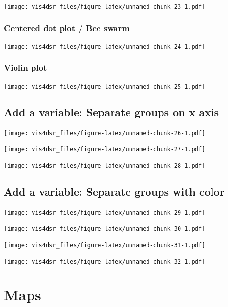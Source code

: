 \documentclass[
]{krantz}
\begin{document}
\texttt{[image: vis4dsr\_files/figure-latex/unnamed-chunk-23-1.pdf]}

\hypertarget{centered-dot-plot-bee-swarm}{%
\subsubsection{Centered dot plot / Bee swarm}\label{centered-dot-plot-bee-swarm}}

\texttt{[image: vis4dsr\_files/figure-latex/unnamed-chunk-24-1.pdf]}

\hypertarget{violin-plot}{%
\subsubsection{Violin plot}\label{violin-plot}}

\texttt{[image: vis4dsr\_files/figure-latex/unnamed-chunk-25-1.pdf]}

\hypertarget{add-a-variable-separate-groups-on-x-axis}{%
\subsection{Add a variable: Separate groups on x axis}\label{add-a-variable-separate-groups-on-x-axis}}

\texttt{[image: vis4dsr\_files/figure-latex/unnamed-chunk-26-1.pdf]}

\texttt{[image: vis4dsr\_files/figure-latex/unnamed-chunk-27-1.pdf]}

\texttt{[image: vis4dsr\_files/figure-latex/unnamed-chunk-28-1.pdf]}

\hypertarget{add-a-variable-separate-groups-with-color}{%
\subsection{Add a variable: Separate groups with color}\label{add-a-variable-separate-groups-with-color}}

\texttt{[image: vis4dsr\_files/figure-latex/unnamed-chunk-29-1.pdf]}

\texttt{[image: vis4dsr\_files/figure-latex/unnamed-chunk-30-1.pdf]}

\texttt{[image: vis4dsr\_files/figure-latex/unnamed-chunk-31-1.pdf]}

\texttt{[image: vis4dsr\_files/figure-latex/unnamed-chunk-32-1.pdf]}

\hypertarget{maps}{%
\section{Maps}\label{maps}}
\end{document}
